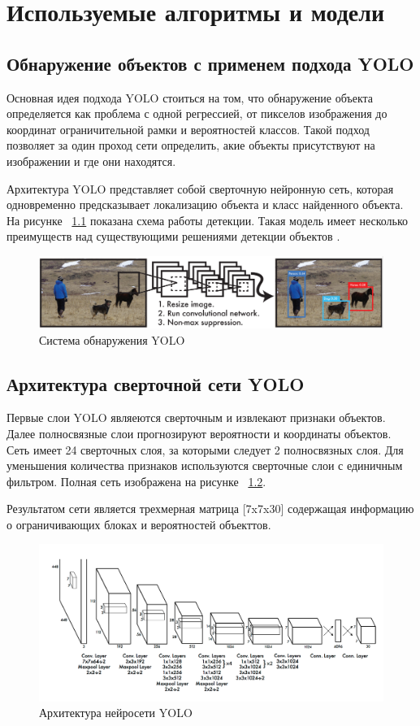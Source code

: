 \documentclass[a4paper,english,russian]{G2-105}
\begin{document}
\chapter{Используемые алгоритмы и модели}
\section{Обнаружение объектов с применем подхода YOLO}
\par Основная идея подхода YOLO стоиться на том, что обнаружение объекта определяется как проблема с одной регрессией, от пикселов изображения до координат ограничительной рамки и вероятностей классов. Такой подход позволяет за один проход сети определить, акие объекты присутствуют на изображении и где они находятся.
\par Архитектура YOLO представляет собой сверточную нейронную сеть, которая одновременно предсказывает локализацию объекта и класс найденного объекта. На рисунке ~\ref{yolo} показана схема работы детекции. Такая модель имеет несколько преимуществ над существующими решениями детекции объектов \cite{16}.
\begin{figure}
    \includegraphics[width=\linewidth]{yolo.png}
    \caption{Система обнаружения YOLO}
	\label{yolo}
\end{figure}
\section{Архитектура сверточной сети YOLO}
\par Первые слои YOLO являеются сверточным и извлекают признаки объектов. Далее полносвязные слои прогнозируют вероятности и координаты объектов. Сеть имеет 24 сверточных слоя, за которыми следует 2 полносвязных слоя. Для уменьшения количества признаков используются сверточные слои с единичным фильтром. Полная сеть изображена на рисунке ~\ref{yolonet}.
\par Результатом сети является трехмерная матрица [7x7x30] содержащая информацию о ограничивающих блоках и вероятностей объекттов. 
\begin{figure}
	\begin{center}
    		\includegraphics[width=\linewidth]{yolonet.png}
    		\caption{Архитектура нейросети YOLO}
		\label{yolonet}
	\end{center}
\end{figure}
\end{document}
